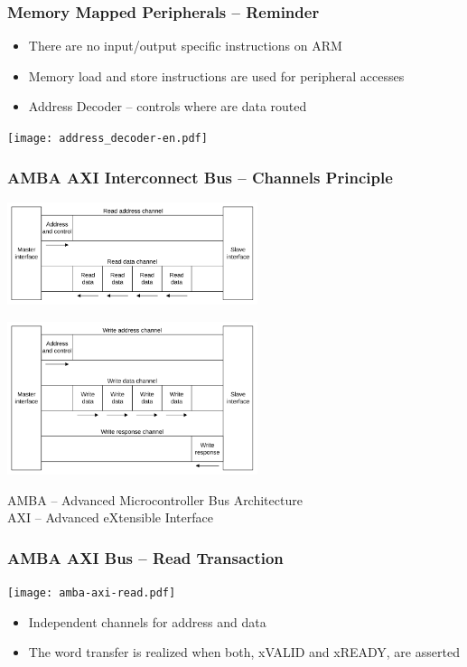 \documentclass{beamer}
\begin{document}
\begin{frame}
\frametitle{Memory Mapped Peripherals -- Reminder}

\begin{itemize}
\item There are no input/output specific instructions on ARM
\item Memory load and store instructions are used for peripheral accesses
\item Address Decoder -- controls where are data routed
\end{itemize}
\begin{center}
\texttt{[image: address\_decoder-en.pdf]}
\end{center}
\end{frame}

\begin{frame}
\frametitle{AMBA AXI Interconnect Bus -- Channels Principle}

\begin{center}
\includegraphics[width=0.55\textwidth]{amba-axi-read-concept-en}
\end{center}

\begin{center}
\includegraphics[width=0.55\textwidth]{amba-axi-write-concept-en}
\end{center}

\footnotesize{AMBA -- Advanced Microcontroller Bus Architecture \\ AXI -- Advanced eXtensible Interface}

\end{frame}

\begin{frame}
\frametitle{AMBA AXI Bus -- Read Transaction}

\begin{center}
\texttt{[image: amba-axi-read.pdf]}
\end{center}

\begin{itemize}
\item Independent channels for address and data
\item The word transfer is realized when both, xVALID and xREADY, are asserted
\end{itemize}

\end{frame}
\end{document}
